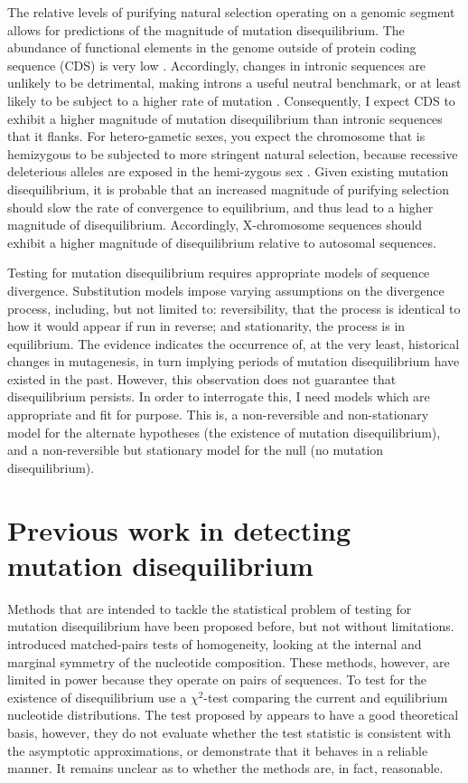 The relative levels of purifying natural selection operating on a genomic segment allows for predictions of the magnitude of mutation disequilibrium. The abundance of functional elements in the genome outside of protein coding sequence (CDS) is very low \citep{Graur2013OnENCODE}. Accordingly, changes in intronic sequences are unlikely to be detrimental, making introns a useful neutral benchmark, or at least likely to be subject to a higher rate of mutation \citep{Graur2013OnENCODE}. Consequently, I expect CDS to exhibit a higher magnitude of mutation disequilibrium than intronic sequences that it flanks. For hetero-gametic sexes, you expect the chromosome that is hemizygous to be subjected to more stringent natural selection, because recessive deleterious alleles are exposed in the hemi-zygous sex \citep{Charlesworth1987TheAutosomes}. Given existing mutation disequilibrium, it is probable that an increased magnitude of purifying selection should slow the rate of convergence to equilibrium, and thus lead to a higher magnitude of disequilibrium. Accordingly, X-chromosome sequences should exhibit a higher magnitude of disequilibrium relative to autosomal sequences. 

Testing for mutation disequilibrium requires appropriate \gls{models} of sequence divergence. \Gls{Substitution models} impose varying assumptions on the divergence process, including, but not limited to: reversibility, that the process is identical to how it would appear if run in reverse; and \gls{stationarity}, the process is in \gls{equilibrium}. The evidence indicates the occurrence of, at the very least, historical changes in mutagenesis, in turn implying periods of mutation disequilibrium have existed in the past. However, this observation does not guarantee that disequilibrium persists. In order to interrogate this, I need models which are appropriate and fit for purpose. This is, a non-reversible and non-stationary model for the alternate hypotheses (the existence of mutation disequilibrium), and a non-reversible but stationary model for the null (no mutation disequilibrium). 

\section{Previous work in detecting mutation disequilibrium}

Methods that are intended to tackle the statistical problem of testing for mutation disequilibrium have been proposed before, but not without limitations. \cite{Ababneh2006Matched-pairsSequences} introduced matched-pairs tests of homogeneity, looking at the internal and marginal symmetry of the nucleotide composition. These methods, however, are limited in power because they operate on pairs of sequences. To test for the existence of disequilibrium \cite{Squartini2008QuantifyingProcess} use a $\chi^2$-test comparing the current and equilibrium nucleotide distributions. The test proposed by \cite{Squartini2008QuantifyingProcess} appears to have a good theoretical basis, however, they do not evaluate whether the test statistic is consistent with the asymptotic approximations, or demonstrate that it behaves in a reliable manner. It remains unclear as to whether the methods are, in fact, reasonable. 

